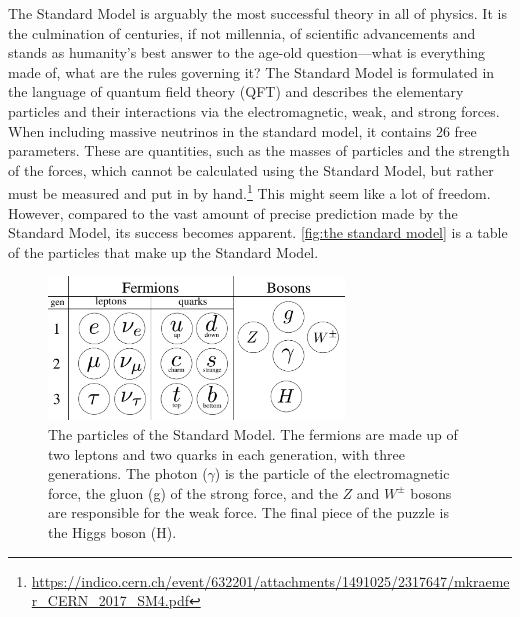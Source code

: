 The Standard Model is arguably the most successful theory in all of physics.
It is the culmination of centuries, if not millennia, of scientific advancements and stands as humanity's best answer to the age-old question---what is everything made of, what are the rules governing it?
The Standard Model is formulated in the language of quantum field theory (QFT) and describes the elementary particles and their interactions via the electromagnetic, weak, and strong forces.
When including massive neutrinos in the standard model, it contains 26 free parameters.
These are quantities, such as the masses of particles and the strength of the forces, which cannot be calculated using the Standard Model, but rather must be measured and put in by hand.\footnote{\url{https://indico.cern.ch/event/632201/attachments/1491025/2317647/mkraemer_CERN_2017_SM4.pdf}}
This might seem like a lot of freedom.
However, compared to the vast amount of precise prediction made by the Standard Model, its success becomes apparent.
\autoref{fig:the standard model} is a table of the particles that make up the Standard Model.

\begin{figure}[h]
    \centering
    \includegraphics[width=0.7\textwidth]{figurer/standard_model2.pdf}
    \caption{The particles of the Standard Model. The fermions are made up of two leptons and two quarks in each generation, with three generations. The photon ($\gamma$) is the particle of the electromagnetic force, the gluon (g) of the strong force, and the $Z$ and $W^\pm$ bosons are responsible for the weak force. The final piece of the puzzle is the Higgs boson (H).}
    \label{fig:the standard model}
\end{figure}

